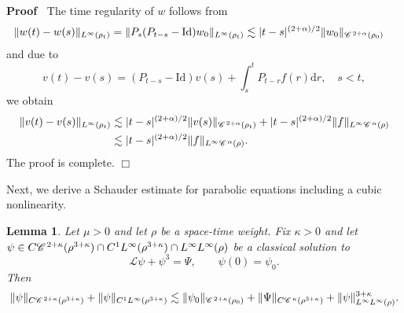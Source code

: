 \documentclass[a4paper,11pt]{article}
\newenvironment{proof}{\noindent\textbf{Proof\ }}{\hspace*{\fill}$\Box$\medskip}
\newtheorem{lemma}[theorem]{Lemma}
\numberwithin{equation}{section}
\newcommand{\CC}{\mathscr{C} \hspace{.1em}}
\newcommand{\LL}{\mathscr{L}}
\newcommand{\8}{\infty}
\newcommand{\dd}{\mathrm{d}}
\begin{document}
\begin{proof}
The time regularity of $w$ follows from
\begin{align*}
\|w(t)-w(s)\|_{L^{\infty}(\rho_{t})}&=\|P_{s}(P_{t-s}-\mathrm{Id})w_{0}\|_{L^{\infty}(\rho_{t})}\lesssim |t-s|^{(2+\alpha)/2}\|w_{0}\|_{\CC^{2+\alpha}(\rho_{0})}
\end{align*}
and due to
$$
v(t)-v(s)=(P_{t-s}-\mathrm{Id})v({s})+\int_{s}^{t} P_{t-r}f({r})\dd r,\quad s<t,
$$
we obtain
\begin{align*}
\|v(t)-v(s)\|_{L^{\infty}(\rho_{t})}&\lesssim |t-s|^{(2+\alpha)/2}\|v({s})\|_{\CC^{2+\alpha}(\rho_{t})}+ |t-s|^{(2+\alpha)/2}\|f \|_{L^{\infty}\CC^{\alpha}(\rho)}\\
&\lesssim |t-s|^{(2+\alpha)/2}\|f \|_{L^{\infty}\CC^{\alpha}(\rho)}.
\end{align*}
The proof is complete.
\end{proof}


Next, we derive a Schauder estimate for  parabolic equations including a cubic nonlinearity.

\begin{lemma}
  \label{lemma:schauder-par}
Let $\mu>0$ and let $\rho$ be a space-time weight.  Fix $\kappa > 0$ and let $\psi \in C\CC^{2 +
  \kappa} (\rho^{3 + \kappa}) \cap C^{1}L^{\infty} (\rho^{3+\kappa})\cap L^{\infty}L^{\infty}(\rho)$ be a classical solution
  to
  \[\LL  \psi + \psi^3 = \Psi ,\qquad \psi(0)=\psi_{0}.\]
Then
  \[ \| \psi \|_{C\CC^{2 + \kappa} (\rho^{3 + \kappa})} +\|\psi\|_{C^{1}L^{\infty}(\rho^{3+\kappa})} \lesssim \|\psi_{0}\|_{\CC^{2+\kappa}(\rho_{0})}+  \|
     \Psi \|_{C\CC^{\kappa} (\rho^{3 + \kappa})} + \| \psi \|_{L^{\infty}L^{\infty}
     (\rho)}^{3 + \kappa}. \]
\end{lemma}
\end{document}

